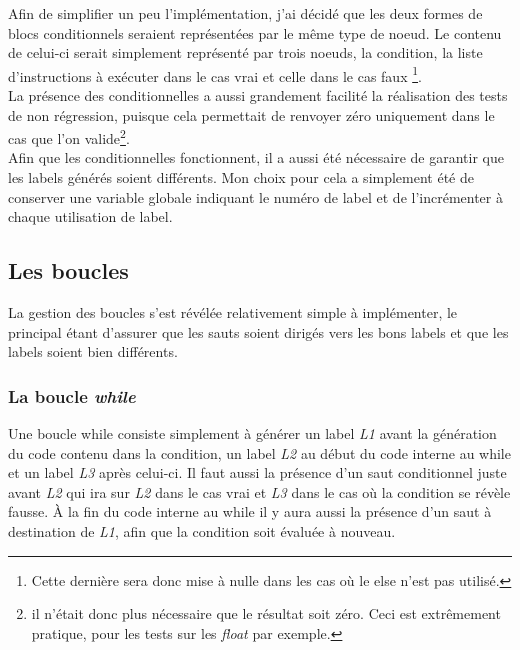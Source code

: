 \documentclass[12pt]{article}
\begin{document}
Afin de simplifier un peu l'implémentation, j'ai décidé que les deux formes
de blocs conditionnels seraient représentées par le même type de noeud. Le
contenu de celui-ci serait simplement représenté par trois noeuds, la condition,
la liste d'instructions à exécuter dans le cas vrai et celle dans le cas faux
\footnote{Cette dernière sera donc mise à nulle dans les cas où le else n'est
pas utilisé.}.\\

La présence des conditionnelles a aussi grandement facilité la réalisation
des tests de non régression, puisque cela permettait de renvoyer zéro
uniquement dans le cas que l'on valide\footnote{il n'était donc plus
nécessaire que le résultat soit zéro. Ceci est extrêmement pratique, pour les
tests sur les {\em float} par exemple.}.\\

Afin que les conditionnelles fonctionnent, il a aussi été nécessaire de garantir
que les labels générés soient différents. Mon choix pour cela a simplement été
de conserver une variable globale indiquant le numéro de label et de
l'incrémenter à chaque utilisation de label.

\subsection{Les boucles}
La gestion des boucles s'est révélée relativement simple à implémenter,
le principal étant d'assurer que les sauts soient dirigés vers les bons
labels et que les labels soient bien différents.

\subsubsection{La boucle \em{while}}
Une boucle while consiste simplement à générer un label {\em L1} avant la
génération du code contenu dans la condition, un label {\em L2} au début du code
interne au while et un label {\em L3} après celui-ci. Il faut aussi la présence
d'un saut conditionnel juste avant {\em L2} qui ira sur {\em L2} dans le cas vrai
et {\em L3} dans le cas où la condition se révèle fausse. À la fin du code
interne au while il y aura aussi la présence d'un saut à destination de {\em L1},
afin que la condition soit évaluée à nouveau.
\end{document}
